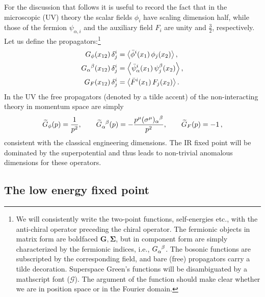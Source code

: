 \documentclass[11pt]{article}
\newcommand{\psib}{\bar{\psi}}
\newcommand{\phib}{\bar{\phi}}
\newcommand{\Fb}{\bar{F}}
\newcommand{\Gt}{\widetilde{G}}
\begin{document}
For the discussion that follows it is useful to record the fact that in the microscopic (UV) theory the scalar fields $\phi_i$ have scaling dimension half, while those of the fermion $\psi_{\alpha,i}$ and the auxiliary field $F_i$ are unity  and $\frac{3}{2}$, respectively.  Let us define the propagators:\footnote{ We will consistently write the two-point functions, self-energies etc.,  with the anti-chiral operator preceding the chiral operator. The fermionic objects in matrix form are boldfaced $\mathbf{G}, \bm{\Sigma}$, but in component form are simply characterized by the  fermionic indices, i.e., $G\indices{_\alpha^\beta}$. The bosonic functions are subscripted by the corresponding field, and bare (free) propagators carry a tilde decoration. Superspace Green's functions will be disambiguated by a mathscript font ($\mathscr{G}$). The argument of the function should make clear whether we are in position space or in the Fourier domain. }
%
\begin{equation}\label{eq:propG}
\begin{split}
G_\phi(x_{12}) \, \delta^i_j 
&=
	\expval{\phib^i(x_1)\,\phi_j(x_2)},\\
G_\alpha{}^\beta(x_{12})\,\delta^i_j 
&=
	\expval{ \psib_{\alpha}^i(x_1)\,\psi^\beta_{j}(x_2)},\\
G_F(x_{12})\,\delta^i_j 
&=
	\expval{\Fb^i(x_1)\,F_j(x_2)}.
\end{split}
\end{equation}
%
In the UV the free propagators (denoted by a tilde accent) of the non-interacting theory in momentum space are simply
%
\begin{equation}\label{eq:G0s}
\Gt_\phi(p) = \frac{1}{p^2},
\qquad 
\Gt\indices{_\alpha^\beta}(p)= - \frac{p^\mu(\sigma^\mu)_\alpha{}^\beta}{p^2},
\qquad 
\Gt_F(p)=-1\,,
 \end{equation}	
%
consistent with the classical engineering dimensions. The IR fixed point will be dominated by the superpotential and thus leads to non-trivial anomalous dimensions for these operators.

\subsection{The low energy fixed point}
\label{sec:ir2pt}
\end{document}
